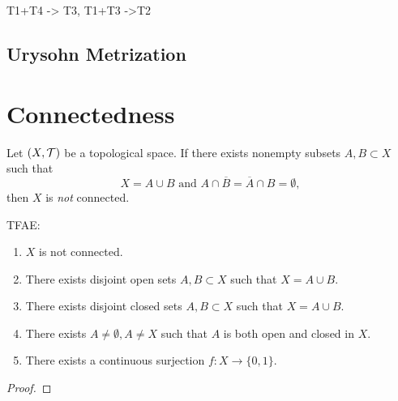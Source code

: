 T1+T4 -> T3, T1+T3 ->T2

\subsection{Urysohn Metrization}


\section{Connectedness}

\begin{definition}
    Let $(X,\mathcal{T})$ be a topological space.
    If there exists nonempty subsets $A,B\subset X$ such that $$X=A\cup B\text{ and }A\cap\overline{B}=\overline{A}\cap B=\emptyset,$$ then $X$ is \textit{not} connected.
\end{definition}

\begin{proposition}
    TFAE:
    \begin{enumerate}
        \item $X$ is not connected.
        \item There exists disjoint open sets $A,B\subset X$ such that $X=A\cup B$.
        \item There exists disjoint closed sets $A,B\subset X$ such that $X=A\cup B$.
        \item There exists $A\neq \emptyset,A\neq X$ such that $A$ is both open and closed in $X$.
        \item There exists a continuous surjection $f:X\to\{0,1\}$. 
    \end{enumerate}
\end{proposition}
\begin{proof}
    
\end{proof}